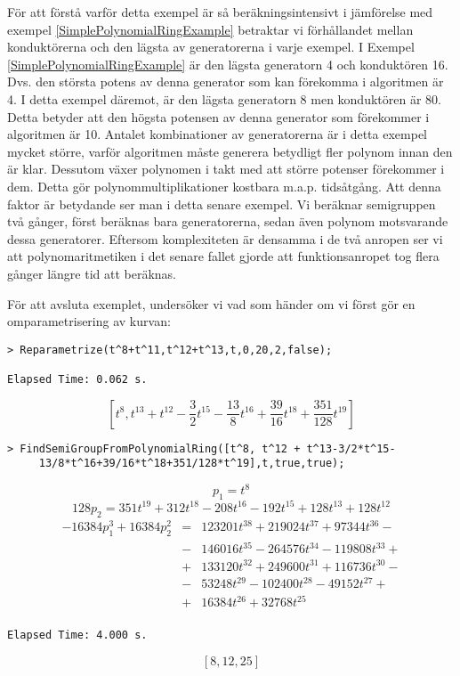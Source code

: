 För att förstå varför detta exempel är så beräkningsintensivt i jämförelse med exempel \ref{SimplePolynomialRingExample} betraktar vi förhållandet mellan konduktörerna och den lägsta av generatorerna i varje exempel. I Exempel \ref{SimplePolynomialRingExample} är den lägsta generatorn 4 och konduktören 16. Dvs. den största potens av denna generator som kan förekomma i algoritmen är 4. I detta exempel däremot, är den lägsta generatorn 8 men konduktören är 80. Detta betyder att den högsta potensen av denna generator som förekommer i algoritmen är 10. Antalet kombinationer av generatorerna är i detta exempel mycket större, varför algoritmen måste generera betydligt fler polynom innan den är klar. Dessutom växer polynomen i takt med att större potenser förekommer i dem. Detta gör polynommultiplikationer kostbara m.a.p. tidsåtgång. Att denna faktor är betydande ser man i detta senare exempel. Vi beräknar semigruppen två gånger, först beräknas bara generatorerna, sedan även polynom motsvarande dessa generatorer. Eftersom komplexiteten är densamma i de två anropen ser vi att polynomaritmetiken i det senare fallet gjorde att funktionsanropet tog flera gånger längre tid att beräknas.

För att avsluta exemplet, undersöker vi vad som händer om vi först gör en
omparametrisering av kurvan:

\begin{verbatim}
> Reparametrize(t^8+t^11,t^12+t^13,t,0,20,2,false);

Elapsed Time: 0.062 s.
\end{verbatim}
\[\left[t^8, t^{13}+t^{12}-\frac{3}{2}t^{15}-\frac{13}{8}t^{16}+\frac{39}{16}t^{18}+\frac{351}{128}t^{19}\right]\]

\begin{verbatim}
> FindSemiGroupFromPolynomialRing([t^8, t^12 + t^13-3/2*t^15-
     13/8*t^16+39/16*t^18+351/128*t^19],t,true,true);
\end{verbatim}
\[p_1 = t^8\]
\[128p_2 = 351t^{19}+312t^{18}-208t^{16}-192t^{15}+128t^{13}+128t^{12}\]
\[
\begin{array}{rcl}
-16384p_1^3+16384p_2^2 & = & 123201t^{38}+219024t^{37}+97344t^{36}-\\
& - & 146016t^{35}-264576t^{34}-119808t^{33}+\\
& + & 133120t^{32}+249600t^{31}+116736t^{30}-\\
& - & 53248t^{29}-102400t^{28}-49152t^{27}+\\
& + & 16384t^{26}+32768t^{25}\\
\end{array}
\]
\begin{verbatim}
Elapsed Time: 4.000 s.
\end{verbatim}
\[\left[8, 12, 25\right]\]

